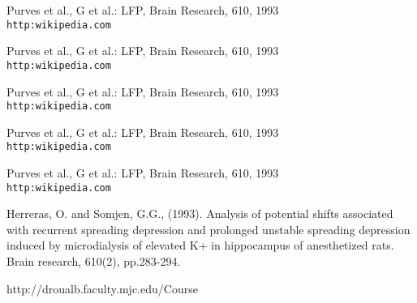 \documentclass{article}
\begin{document}
\begin{thebibliography}{1}
Purves et al., G et al.: LFP,
Brain Research, 610, 1993
\\\texttt{http:wikipedia.com}

Purves et al., G et al.: LFP,
Brain Research, 610, 1993
\\\texttt{http:wikipedia.com}

Purves et al., G et al.: LFP,
Brain Research, 610, 1993
\\\texttt{http:wikipedia.com}

Purves et al., G et al.: LFP,
Brain Research, 610, 1993
\\\texttt{http:wikipedia.com}

Purves et al., G et al.: LFP,
Brain Research, 610, 1993
\\\texttt{http:wikipedia.com}

Herreras, O. and Somjen, G.G., (1993). Analysis of potential shifts associated with recurrent spreading depression and prolonged unstable spreading depression induced by microdialysis of elevated K+ in hippocampus of anesthetized rats. Brain research, 610(2), pp.283-294.

http://droualb.faculty.mjc.edu/Course%

\end{thebibliography}
\end{document}

